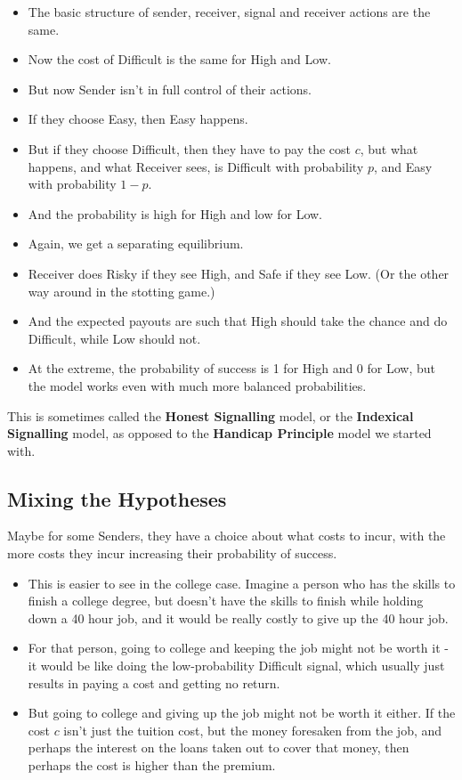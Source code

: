 \documentclass[11pt,]{article}
\providecommand{\tightlist}{%
  \setlength{\itemsep}{0pt}\setlength{\parskip}{0pt}}
\begin{document}
\begin{itemize}
\tightlist
\item
  The basic structure of sender, receiver, signal and receiver actions
  are the same.
\item
  Now the cost of Difficult is the same for High and Low.
\item
  But now Sender isn't in full control of their actions.
\item
  If they choose Easy, then Easy happens.
\item
  But if they choose Difficult, then they have to pay the cost \(c\),
  but what happens, and what Receiver sees, is Difficult with
  probability \(p\), and Easy with probability \(1-p\).
\item
  And the probability is high for High and low for Low.
\item
  Again, we get a separating equilibrium.
\item
  Receiver does Risky if they see High, and Safe if they see Low. (Or
  the other way around in the stotting game.)
\item
  And the expected payouts are such that High should take the chance and
  do Difficult, while Low should not.
\item
  At the extreme, the probability of success is 1 for High and 0 for
  Low, but the model works even with much more balanced probabilities.
\end{itemize}

This is sometimes called the \textbf{Honest Signalling} model, or the
\textbf{Indexical Signalling} model, as opposed to the \textbf{Handicap
Principle} model we started with.

\hypertarget{mixing-the-hypotheses}{%
\subsection{Mixing the Hypotheses}\label{mixing-the-hypotheses}}

Maybe for some Senders, they have a choice about what costs to incur,
with the more costs they incur increasing their probability of success.

\begin{itemize}
\tightlist
\item
  This is easier to see in the college case. Imagine a person who has
  the skills to finish a college degree, but doesn't have the skills to
  finish while holding down a 40 hour job, and it would be really costly
  to give up the 40 hour job.
\item
  For that person, going to college and keeping the job might not be
  worth it - it would be like doing the low-probability Difficult
  signal, which usually just results in paying a cost and getting no
  return.
\item
  But going to college and giving up the job might not be worth it
  either. If the cost \(c\) isn't just the tuition cost, but the money
  foresaken from the job, and perhaps the interest on the loans taken
  out to cover that money, then perhaps the cost is higher than the
  premium.
\end{itemize}
\end{document}
